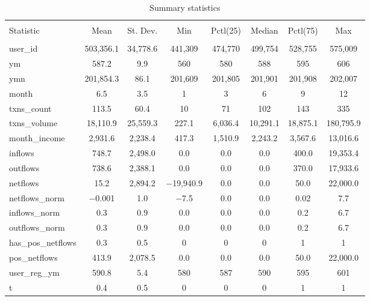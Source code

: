 
\begin{table}[H] \centering 
  \caption{Summary statistics} 
  \label{tab:sumstats} 
\footnotesize 
\begin{tabular}{@{\extracolsep{5pt}}lccccccc} 
\\[-1.8ex]\hline 
\hline \\[-1.8ex] 
Statistic & \multicolumn{1}{c}{Mean} & \multicolumn{1}{c}{St. Dev.} & \multicolumn{1}{c}{Min} & \multicolumn{1}{c}{Pctl(25)} & \multicolumn{1}{c}{Median} & \multicolumn{1}{c}{Pctl(75)} & \multicolumn{1}{c}{Max} \\ 
\hline \\[-1.8ex] 
user\_id & 503,356.1 & 34,778.6 & 441,309 & 474,770 & 499,754 & 528,755 & 575,009 \\ 
ym & 587.2 & 9.9 & 560 & 580 & 588 & 595 & 606 \\ 
ymn & 201,854.3 & 86.1 & 201,609 & 201,805 & 201,901 & 201,908 & 202,007 \\ 
month & 6.5 & 3.5 & 1 & 3 & 6 & 9 & 12 \\ 
txns\_count & 113.5 & 60.4 & 10 & 71 & 102 & 143 & 335 \\ 
txns\_volume & 18,110.9 & 25,559.3 & 227.1 & 6,036.4 & 10,291.1 & 18,875.1 & 180,795.9 \\ 
month\_income & 2,931.6 & 2,238.4 & 417.3 & 1,510.9 & 2,243.2 & 3,567.6 & 13,016.6 \\ 
inflows & 748.7 & 2,498.0 & 0.0 & 0.0 & 0.0 & 400.0 & 19,353.4 \\ 
outflows & 738.6 & 2,388.1 & 0.0 & 0.0 & 0.0 & 370.0 & 17,933.6 \\ 
netflows & 15.2 & 2,894.2 & $-$19,940.9 & 0.0 & 0.0 & 50.0 & 22,000.0 \\ 
netflows\_norm & $-$0.001 & 1.0 & $-$7.5 & 0.0 & 0.0 & 0.02 & 7.7 \\ 
inflows\_norm & 0.3 & 0.9 & 0.0 & 0.0 & 0.0 & 0.2 & 6.7 \\ 
outflows\_norm & 0.3 & 0.9 & 0.0 & 0.0 & 0.0 & 0.2 & 6.7 \\ 
has\_pos\_netflows & 0.3 & 0.5 & 0 & 0 & 0 & 1 & 1 \\ 
pos\_netflows & 413.9 & 2,078.5 & 0.0 & 0.0 & 0.0 & 50.0 & 22,000.0 \\ 
user\_reg\_ym & 590.8 & 5.4 & 580 & 587 & 590 & 595 & 601 \\ 
t & 0.4 & 0.5 & 0 & 0 & 0 & 1 & 1 \\ 

\end{tabular}
\end{table}
